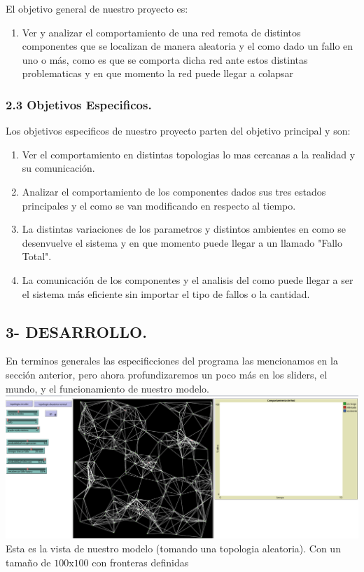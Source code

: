 \documentclass[12pt]{article}
\begin{document}
El objetivo general de nuestro proyecto es:\\

\begin{enumerate}
    \item Ver y analizar el comportamiento de una red remota de distintos componentes que se localizan de manera aleatoria y el como dado un fallo en uno o más, como es que se comporta dicha red ante estos distintas
    problematicas y en que momento la red puede llegar a colapsar 
\end{enumerate}

{\color{red} \subsubsection*{2.3 Objetivos Especificos.}}
\vspace{1em}

Los objetivos especificos de nuestro proyecto parten del objetivo principal y son:\\
\begin{enumerate}
    \item Ver el comportamiento en distintas topologias lo mas cercanas a la realidad y su comunicación.
    \item Analizar el comportamiento de los componentes dados sus tres estados principales y el como se van modificando en respecto al tiempo.
    \item La distintas variaciones de los parametros y distintos ambientes en como se desenvuelve el sistema y en que momento puede llegar a un llamado "Fallo Total".
    \item La comunicación de los componentes y el analisis del como puede llegar a ser el sistema más eficiente sin importar el tipo de fallos o la cantidad.
\end{enumerate}


{\color{blue} \subsection*{3- DESARROLLO.}}
\vspace{1em}

En terminos generales las especificciones del programa las mencionamos en la sección anterior, pero ahora profundizaremos un poco más en los sliders, el mundo, y el funcionamiento de nuestro modelo.\\

\textbf{\includegraphics[scale = 0.30]{images/vista-general.png}}\\
Esta es la vista de nuestro modelo (tomando una topologia aleatoria). Con un tamaño de $100$x$100$ con fronteras definidas\\
\end{document}
